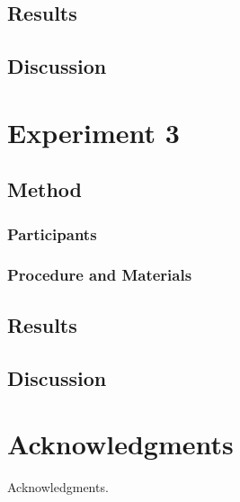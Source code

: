 \documentclass[10pt,letterpaper]{article}
\begin{document}
  \subsection{Results}
  \subsection{Discussion}
  
\section{Experiment 3}
  \subsection{Method}
    \subsubsection{Participants}
    \subsubsection{Procedure and Materials}
  \subsection{Results}
  \subsection{Discussion}

\section{Acknowledgments}

Acknowledgments.

\nocite{label}




\setlength{\bibleftmargin}{.125in}
\setlength{\bibindent}{-\bibleftmargin}


\end{document}
